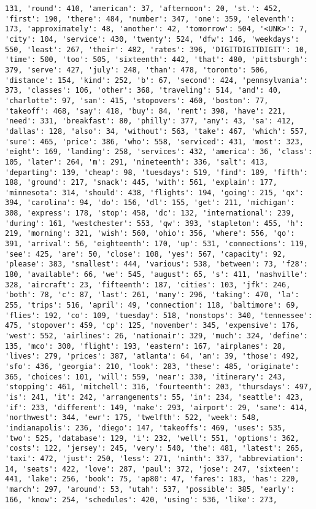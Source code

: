 \documentclass[11pt]{article}
\begin{document}
\begin{Verbatim}[commandchars=\\\{\}]
131, 'round': 410, 'american': 37, 'afternoon': 20, 'st.': 452, 'first': 190, 'there': 484, 'number': 347, 'one': 359, 'eleventh': 173, 'approximately': 48, 'another': 42, 'tomorrow': 504, '<UNK>': 7, 'city': 104, 'service': 430, 'twenty': 524, 'dfw': 146, 'weekdays': 550, 'least': 267, 'their': 482, 'rates': 396, 'DIGITDIGITDIGIT': 10, 'time': 500, 'too': 505, 'sixteenth': 442, 'that': 480, 'pittsburgh': 379, 'serve': 427, 'july': 248, 'than': 478, 'toronto': 506, 'distance': 154, 'kind': 252, 'b': 67, 'second': 424, 'pennsylvania': 373, 'classes': 106, 'other': 368, 'traveling': 514, 'and': 40, 'charlotte': 97, 'san': 415, 'stopovers': 460, 'boston': 77, 'takeoff': 468, 'say': 418, 'buy': 84, 'rent': 398, 'have': 221, 'need': 331, 'breakfast': 80, 'philly': 377, 'any': 43, 'sa': 412, 'dallas': 128, 'also': 34, 'without': 563, 'take': 467, 'which': 557, 'sure': 465, 'price': 386, 'who': 558, 'serviced': 431, 'most': 323, 'eight': 169, 'landing': 258, 'services': 432, 'america': 36, 'class': 105, 'later': 264, 'm': 291, 'nineteenth': 336, 'salt': 413, 'departing': 139, 'cheap': 98, 'tuesdays': 519, 'find': 189, 'fifth': 188, 'ground': 217, 'snack': 445, 'with': 561, 'explain': 177, 'minnesota': 314, 'should': 438, 'flights': 194, 'going': 215, 'qx': 394, 'carolina': 94, 'do': 156, 'dl': 155, 'get': 211, 'michigan': 308, 'express': 178, 'stop': 458, 'dc': 132, 'international': 239, 'during': 161, 'westchester': 553, 'qw': 393, 'stapleton': 455, 'h': 219, 'morning': 321, 'wish': 560, 'ohio': 356, 'where': 556, 'qo': 391, 'arrival': 56, 'eighteenth': 170, 'up': 531, 'connections': 119, 'see': 425, 'are': 50, 'close': 108, 'yes': 567, 'capacity': 92, 'please': 383, 'smallest': 444, 'various': 538, 'between': 73, 'f28': 180, 'available': 66, 'we': 545, 'august': 65, 's': 411, 'nashville': 328, 'aircraft': 23, 'fifteenth': 187, 'cities': 103, 'jfk': 246, 'both': 78, 'c': 87, 'last': 261, 'many': 296, 'taking': 470, 'la': 255, 'trips': 516, 'april': 49, 'connection': 118, 'baltimore': 69, 'flies': 192, 'co': 109, 'tuesday': 518, 'nonstops': 340, 'tennessee': 475, 'stopover': 459, 'cp': 125, 'november': 345, 'expensive': 176, 'west': 552, 'airlines': 26, 'nationair': 329, 'much': 324, 'define': 135, 'mco': 300, 'flight': 193, 'eastern': 167, 'airplanes': 28, 'lives': 279, 'prices': 387, 'atlanta': 64, 'an': 39, 'those': 492, 'sfo': 436, 'georgia': 210, 'look': 283, 'these': 485, 'originate': 365, 'choices': 101, 'will': 559, 'near': 330, 'itinerary': 243, 'stopping': 461, 'mitchell': 316, 'fourteenth': 203, 'thursdays': 497, 'is': 241, 'it': 242, 'arrangements': 55, 'in': 234, 'seattle': 423, 'if': 233, 'different': 149, 'make': 293, 'airport': 29, 'same': 414, 'northwest': 344, 'ewr': 175, 'twelfth': 522, 'week': 548, 'indianapolis': 236, 'diego': 147, 'takeoffs': 469, 'uses': 535, 'two': 525, 'database': 129, 'i': 232, 'well': 551, 'options': 362, 'costs': 122, 'jersey': 245, 'very': 540, 'the': 481, 'latest': 265, 'taxi': 472, 'just': 250, 'less': 271, 'ninth': 337, 'abbreviation': 14, 'seats': 422, 'love': 287, 'paul': 372, 'jose': 247, 'sixteen': 441, 'lake': 256, 'book': 75, 'ap80': 47, 'fares': 183, 'has': 220, 'march': 297, 'around': 53, 'utah': 537, 'possible': 385, 'early': 166, 'know': 254, 'schedules': 420, 'using': 536, 'like': 273, 
\end{Verbatim}
\end{document}
